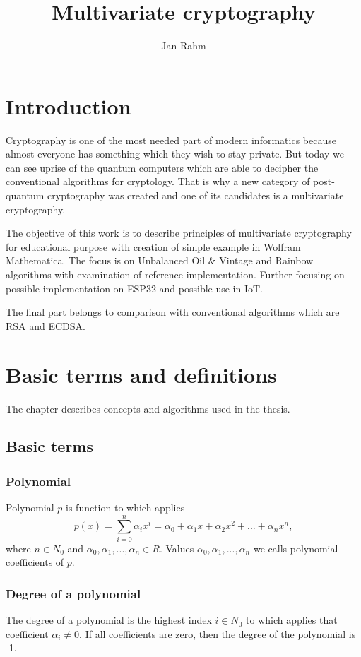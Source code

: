 \documentclass[thesis=M,english]{FITthesis}[2019/12/23]
\title{Multivariate cryptography}
\author{Jan Rahm} %
\begin{document}

\chapter{Introduction}
Cryptography is one of the most needed part of modern informatics because almost everyone has something which they wish to stay private. But today we can see uprise of the quantum computers which are able to decipher the conventional algorithms for cryptology. That is why a new category of post-quantum cryptography was created and one of its candidates is a multivariate cryptography.

The objective of this work is to describe principles of multivariate cryptography for educational purpose with creation of simple example in Wolfram Mathematica. The focus is on Unbalanced Oil \& Vintage and Rainbow algorithms with examination of reference implementation. Further focusing on possible implementation on ESP32 and possible use in IoT.

The final part belongs to comparison with conventional algorithms which are RSA and ECDSA.

\chapter{Basic terms and definitions}
The chapter describes concepts and algorithms used in the thesis.

\section{Basic terms}
\subsection{Polynomial}
Polynomial $p$ is function to which applies
\[
	p(x) = \sum\limits_{i=0}^n {\alpha_ix^i} = \alpha_0 + \alpha_1x + \alpha_2x^2 + ... + \alpha_nx^n,
\]
where $n \in N_0$ and $\alpha_0, \alpha_1, ..., \alpha_n \in R$. Values $\alpha_0, \alpha_1, ..., \alpha_n$ we calls polynomial coefficients of $p$.  

\subsection{Degree of a polynomial}
The degree of a polynomial is the highest index $i \in N_0$ to which applies that coefficient $\alpha_i \ne 0$. If all coefficients are zero, then the degree of the polynomial is -1.
\end{document}
